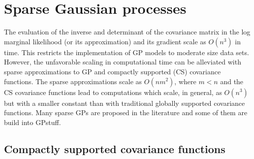 \documentclass[twoside,11pt]{article}
\newcommand{\pkg}[1]{{\fontseries{b}\selectfont #1}}
\begin{document}




\section{Sparse Gaussian processes}
\label{cha:sparse-GP}


The evaluation of the inverse and determinant of the covariance matrix
in the log marginal likelihood (or its approximation) and its gradient
scale as $O(n^3)$ in time. This restricts the implementation of GP
models to moderate size data sets. However, the unfavorable scaling in
computational time can be alleviated with sparse approximations to GP
and compactly supported (CS) covariance functions. The sparse
approximations scale as $O(nm^2)$, where $m<n$ and the CS covariance
functions lead to computations which scale, in general, as $O(n^3)$
but with a smaller constant than with traditional globally supported
covariance functions. Many sparse GPs are proposed in the literature
and some of them are build into \pkg{GPstuff}.

\subsection{Compactly supported covariance functions}
\end{document}
